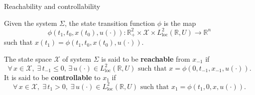 \documentclass[aspectratio=169]{beamer}
\newcommand{\bbR}{\mathbb{R}}
\begin{document}
\begin{frame}{Reachability and controllability}
\begin{overlayarea}{\textwidth}{\textheight}
	
\begin{definition}
		Given the system $\Sigma$, the state transition function $\phi$ is the map 
		\begin{equation*}
			\phi(t_1, t_0, x(t_0), u(\cdot)) : \bbR_+^2 \times \mathcal{X} \times L^{2}_{\text{loc}}(\bbR, U) \rightarrow \bbR^n
		\end{equation*}
		such that $x(t_1) = \phi(t_1, t_0, x(t_0), u(\cdot))$. 
\end{definition}


\begin{definition}
		The state space $\mathcal{X}$ of system $\Sigma$ is said to be \textbf{reachable}
		from $x_{-1}$ if 
		\begin{equation*}
		\forall\, x \in \mathcal{X}, \; \exists\,  t_{-1} \le 0, \, \exists\, u(\cdot) \in L^{2}_{\text{loc}}(\bbR, U) \text{ such that } x = \phi(0, t_{-1}, x_{-1}, u(\cdot)).
		\end{equation*}
				It is said to be \textbf{controllable} to $x_1$ if 
		\begin{equation*}
			\forall\, x \in \mathcal{X}, \; \exists\, t_1 > 0, \; \exists \, u(\cdot) \in L^{2}_{\text{loc}}(\bbR, U) \text{ such that } x_1 = \phi(t_1, 0, x, u(\cdot)).
		\end{equation*}
\end{definition}

\end{overlayarea}

\end{frame}

\end{document}
